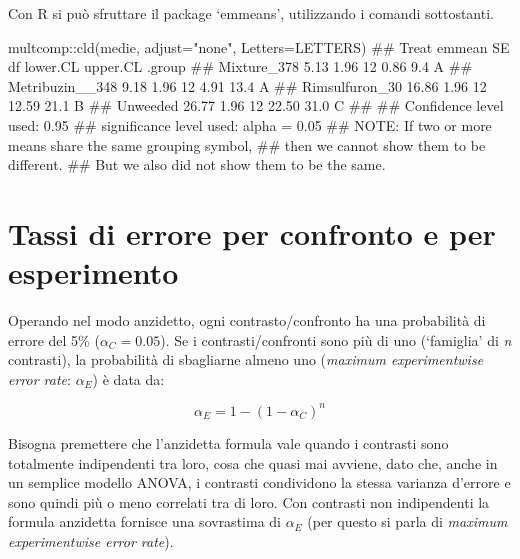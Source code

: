 \documentclass[a4paper,12pt,oneside]{book}
\newenvironment{Shaded}{\begin{snugshade}}{\end{snugshade}}
\newcommand{\SpecialCharTok}[1]{#1}
\newcommand{\StringTok}[1]{#1}
\newcommand{\DocumentationTok}[1]{#1}
\newcommand{\FunctionTok}[1]{#1}
\newcommand{\AttributeTok}[1]{#1}
\newcommand{\AlertTok}[1]{#1}
\newcommand{\NormalTok}[1]{#1}
\begin{document}
Con R si può sfruttare il package `emmeans', utilizzando i comandi sottostanti.

\begin{Shaded}
\begin{Highlighting}[]
\NormalTok{multcomp}\SpecialCharTok{::}\FunctionTok{cld}\NormalTok{(medie, }\AttributeTok{adjust=}\StringTok{"none"}\NormalTok{, }\AttributeTok{Letters=}\NormalTok{LETTERS)}
\DocumentationTok{\#\#  Treat           emmean   SE df lower.CL upper.CL .group}
\DocumentationTok{\#\#  Mixture\_378       5.13 1.96 12     0.86      9.4  A    }
\DocumentationTok{\#\#  Metribuzin\_\_348   9.18 1.96 12     4.91     13.4  A    }
\DocumentationTok{\#\#  Rimsulfuron\_30   16.86 1.96 12    12.59     21.1   B   }
\DocumentationTok{\#\#  Unweeded         26.77 1.96 12    22.50     31.0    C  }
\DocumentationTok{\#\# }
\DocumentationTok{\#\# Confidence level used: 0.95 }
\DocumentationTok{\#\# significance level used: alpha = 0.05 }
\DocumentationTok{\#\# }\AlertTok{NOTE}\DocumentationTok{: If two or more means share the same grouping symbol,}
\DocumentationTok{\#\#       then we cannot show them to be different.}
\DocumentationTok{\#\#       But we also did not show them to be the same.}
\end{Highlighting}
\end{Shaded}

\hypertarget{tassi-di-errore-per-confronto-e-per-esperimento}{%
\section{Tassi di errore per confronto e per esperimento}\label{tassi-di-errore-per-confronto-e-per-esperimento}}

Operando nel modo anzidetto, ogni contrasto/confronto ha una probabilità di errore del 5\% (\(\alpha_C = 0.05\)). Se i contrasti/confronti sono più di uno (`famiglia' di \emph{n} contrasti), la probabilità di sbagliarne almeno uno (\emph{maximum experimentwise error rate}: \(\alpha_E\)) è data da:

\[\alpha_E = 1 - (1 - \alpha_C)^n\]

Bisogna premettere che l'anzidetta formula vale quando i contrasti sono totalmente indipendenti tra loro, cosa che quasi mai avviene, dato che, anche in un semplice modello ANOVA, i contrasti condividono la stessa varianza d'errore e sono quindi più o meno correlati tra di loro. Con contrasti non indipendenti la formula anzidetta fornisce una sovrastima di \(\alpha_E\) (per questo si parla di \emph{maximum experimentwise error rate}).
\end{document}
